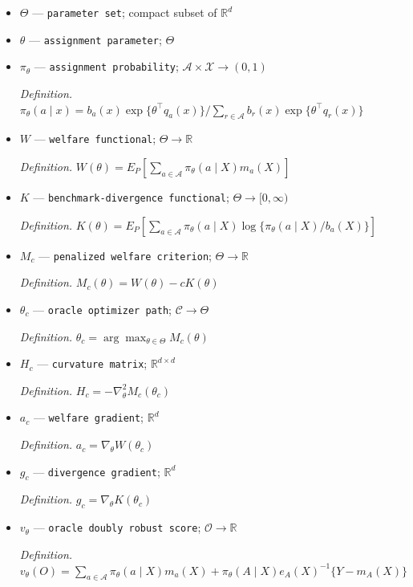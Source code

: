 \documentclass{article}
\begin{document}
\begin{itemize}
  \item \(\Theta\) --- \texttt{parameter set}; compact subset of \(\mathbb R^d\)
  \item \(\theta\) --- \texttt{assignment parameter}; \(\Theta\)
  \item \(\pi_\theta\) --- \texttt{assignment probability}; \(\mathcal A\times\mathcal X\to(0,1)\)
  \par\smallskip\noindent\emph{Definition.} \(\pi_\theta(a\mid x)=b_a(x)\exp\{\theta^\top q_a(x)\}/\sum_{r\in\mathcal A}b_r(x)\exp\{\theta^\top q_r(x)\}\)
  \item \(W\) --- \texttt{welfare functional}; \(\Theta\to\mathbb R\)
  \par\smallskip\noindent\emph{Definition.} \(W(\theta)=E_P[\sum_{a\in\mathcal A}\pi_\theta(a\mid X)m_a(X)]\)
  \item \(K\) --- \texttt{benchmark-\allowbreak{}divergence functional}; \(\Theta\to[0,\infty)\)
  \par\smallskip\noindent\emph{Definition.} \(K(\theta)=E_P[\sum_{a\in\mathcal A}\pi_\theta(a\mid X)\log\{\pi_\theta(a\mid X)/b_a(X)\}]\)
  \item \(M_c\) --- \texttt{penalized welfare criterion}; \(\Theta\to\mathbb R\)
  \par\smallskip\noindent\emph{Definition.} \(M_c(\theta)=W(\theta)-cK(\theta)\)
  \item \(\theta_c\) --- \texttt{oracle optimizer path}; \(\mathcal C\to\Theta\)
  \par\smallskip\noindent\emph{Definition.} \(\theta_c=\arg\max_{\theta\in\Theta}M_c(\theta)\)
  \item \(H_c\) --- \texttt{curvature matrix}; \(\mathbb R^{d\times d}\)
  \par\smallskip\noindent\emph{Definition.} \(H_c=-\nabla_\theta^2M_c(\theta_c)\)
  \item \(a_c\) --- \texttt{welfare gradient}; \(\mathbb R^d\)
  \par\smallskip\noindent\emph{Definition.} \(a_c=\nabla_\theta W(\theta_c)\)
  \item \(g_c\) --- \texttt{divergence gradient}; \(\mathbb R^d\)
  \par\smallskip\noindent\emph{Definition.} \(g_c=\nabla_\theta K(\theta_c)\)
  \item \(v_\theta\) --- \texttt{oracle doubly robust score}; \(\mathcal O\to\mathbb R\)
  \par\smallskip\noindent\emph{Definition.} \(v_\theta(O)=\sum_{a\in\mathcal A}\pi_\theta(a\mid X)m_a(X)+\pi_\theta(A\mid X)e_A(X)^{-1}\{Y-m_A(X)\}\)

\end{itemize}
\end{document}
